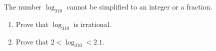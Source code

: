 The number $\log_310$ cannot be simplified to an integer or a fraction.
\begin{enumerate}
\item[(a)] Prove that $\log_310$ is irrational.
\item[(b)] Prove that $2<\log_310<2.1$.
\end{enumerate}
